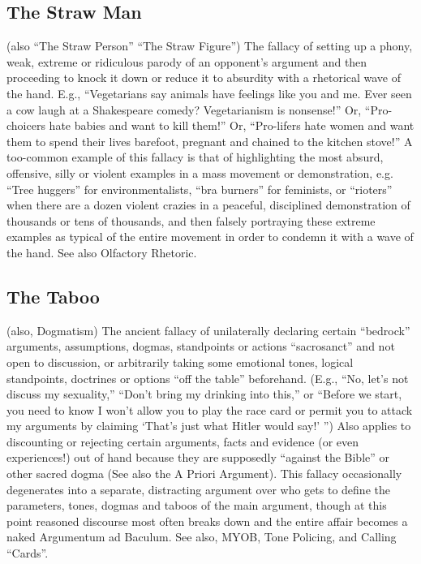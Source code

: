 \documentclass[10pt,a4paper,british]{article}
\begin{document}
\begin{multicols}{2}
	\subsection{The Straw Man} (also ``The Straw Person'' ``The Straw Figure'')
	The fallacy of setting up a phony, weak, extreme or ridiculous parody of an
	opponent's argument and then proceeding to knock it down or reduce it to
	absurdity with a rhetorical wave of the hand. E.g., ``Vegetarians say
	animals have feelings like you and me. Ever seen a cow laugh at a
	Shakespeare comedy? Vegetarianism is nonsense!'' Or, ``Pro{-}choicers hate
	babies and want to kill them!'' Or, ``Pro{-}lifers hate women and want them
	to spend their lives barefoot, pregnant and chained to the kitchen stove!''
	A too{-}common example of this fallacy is that of highlighting the most
	absurd, offensive, silly or violent examples in a mass movement or
	demonstration, e.g. ``Tree huggers'' for environmentalists, ``bra burners''
	for feminists, or ``rioters'' when there are a dozen violent crazies in a
	peaceful, disciplined demonstration of thousands or tens of thousands, and
	then falsely portraying these extreme examples as typical of the entire
	movement in order to condemn it with a wave of the hand. See also Olfactory
	Rhetoric.

    \subsection{The Taboo} (also, Dogmatism) The ancient fallacy of unilaterally
    declaring certain ``bedrock'' arguments, assumptions, dogmas, standpoints
    or actions ``sacrosanct'' and not open to discussion, or arbitrarily taking
    some emotional tones, logical standpoints, doctrines or options ``off the
    table'' beforehand. (E.g., ``No, let's not discuss my sexuality,''
    ``Don't bring my drinking into this,'' or ``Before we start, you need to
    know I won't allow you to play the race card or permit you to attack my
    arguments by claiming `That's just what Hitler would say!' '')  Also applies
    to discounting or rejecting certain arguments, facts and evidence (or even
    experiences!) out of hand because they are supposedly ``against the Bible''
    or other sacred dogma (See also the A Priori Argument). This fallacy
    occasionally degenerates into a separate, distracting argument over who
    gets to define the parameters, tones, dogmas and taboos of the main
    argument, though at this point reasoned discourse most often breaks down
    and the entire affair becomes a naked Argumentum ad Baculum. See also,
    MYOB, Tone Policing, and Calling ``Cards''.


\end{multicols}
\end{document}
